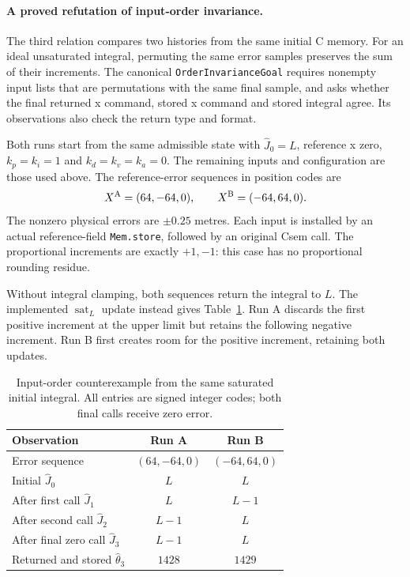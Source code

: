 \documentclass[manuscript, screen, review]{acmart}
\begin{document}
\paragraph{A proved refutation of input-order invariance.}
The third relation compares two histories from the same initial C memory.
For an ideal unsaturated integral, permuting the same error samples
preserves the sum of their increments.
The canonical \texttt{OrderInvarianceGoal} requires nonempty input lists
that are permutations with the same final sample, and asks whether the
final returned x command, stored x command and stored integral agree.
Its observations also check the return type and format.

Both runs start from the same admissible state with $\widehat J_0=L$,
reference x zero, $k_p=k_i=1$ and $k_d=k_v=k_a=0$.
The remaining inputs and configuration are those used above. The
reference-error sequences in position codes are
\begin{equation}
 X^{\rm A}=(64,-64,0),\qquad X^{\rm B}=(-64,64,0).
 \label{eq:pid-order-inputs}
\end{equation}
The nonzero physical errors are $\pm0.25$ metres. Each input is installed
by an actual reference-field \texttt{Mem.store}, followed by an original
Csem call. The proportional increments are exactly $+1,-1$:
this case has no proportional rounding residue.

Without integral clamping, both sequences return the integral to $L$.
The implemented $\operatorname{sat}_L$ update instead gives
Table~\ref{tab:pid-input-order}. Run A discards the first positive
increment at the upper limit but retains the following negative
increment. Run B first creates room for the positive increment,
retaining both updates.

\begin{table}[tb]
\caption{Input-order counterexample from the same saturated initial
integral. All entries are signed integer codes; both final calls receive
zero error.}
\label{tab:pid-input-order}
\centering
\begin{tabular}{lcc}
\toprule
Observation & Run A & Run B\\
\midrule
Error sequence & $(64,-64,0)$ & $(-64,64,0)$\\
Initial $\widehat J_0$ & $L$ & $L$\\
After first call $\widehat J_1$ & $L$ & $L-1$\\
After second call $\widehat J_2$ & $L-1$ & $L$\\
After final zero call $\widehat J_3$ & $L-1$ & $L$\\
Returned and stored $\widehat\theta_3$ & $1428$ & $1429$\\
\bottomrule
\end{tabular}
\end{table}
\end{document}
